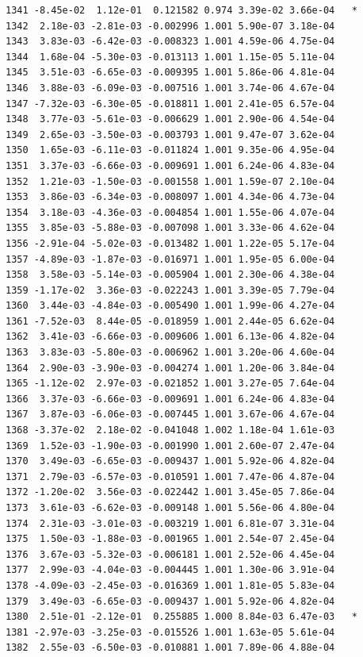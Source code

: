 \documentclass[
  letterpaper,
  DIV=11,
  numbers=noendperiod]{scrartcl}
\begin{document}
\begin{verbatim}
1341 -8.45e-02  1.12e-01  0.121582 0.974 3.39e-02 3.66e-04   *
1342  2.18e-03 -2.81e-03 -0.002996 1.001 5.90e-07 3.18e-04    
1343  3.83e-03 -6.42e-03 -0.008323 1.001 4.59e-06 4.75e-04    
1344  1.68e-04 -5.30e-03 -0.013113 1.001 1.15e-05 5.11e-04    
1345  3.51e-03 -6.65e-03 -0.009395 1.001 5.86e-06 4.81e-04    
1346  3.88e-03 -6.09e-03 -0.007516 1.001 3.74e-06 4.67e-04    
1347 -7.32e-03 -6.30e-05 -0.018811 1.001 2.41e-05 6.57e-04    
1348  3.77e-03 -5.61e-03 -0.006629 1.001 2.90e-06 4.54e-04    
1349  2.65e-03 -3.50e-03 -0.003793 1.001 9.47e-07 3.62e-04    
1350  1.65e-03 -6.11e-03 -0.011824 1.001 9.35e-06 4.95e-04    
1351  3.37e-03 -6.66e-03 -0.009691 1.001 6.24e-06 4.83e-04    
1352  1.21e-03 -1.50e-03 -0.001558 1.001 1.59e-07 2.10e-04    
1353  3.86e-03 -6.34e-03 -0.008097 1.001 4.34e-06 4.73e-04    
1354  3.18e-03 -4.36e-03 -0.004854 1.001 1.55e-06 4.07e-04    
1355  3.85e-03 -5.88e-03 -0.007098 1.001 3.33e-06 4.62e-04    
1356 -2.91e-04 -5.02e-03 -0.013482 1.001 1.22e-05 5.17e-04    
1357 -4.89e-03 -1.87e-03 -0.016971 1.001 1.95e-05 6.00e-04    
1358  3.58e-03 -5.14e-03 -0.005904 1.001 2.30e-06 4.38e-04    
1359 -1.17e-02  3.36e-03 -0.022243 1.001 3.39e-05 7.79e-04    
1360  3.44e-03 -4.84e-03 -0.005490 1.001 1.99e-06 4.27e-04    
1361 -7.52e-03  8.44e-05 -0.018959 1.001 2.44e-05 6.62e-04    
1362  3.41e-03 -6.66e-03 -0.009606 1.001 6.13e-06 4.82e-04    
1363  3.83e-03 -5.80e-03 -0.006962 1.001 3.20e-06 4.60e-04    
1364  2.90e-03 -3.90e-03 -0.004274 1.001 1.20e-06 3.84e-04    
1365 -1.12e-02  2.97e-03 -0.021852 1.001 3.27e-05 7.64e-04    
1366  3.37e-03 -6.66e-03 -0.009691 1.001 6.24e-06 4.83e-04    
1367  3.87e-03 -6.06e-03 -0.007445 1.001 3.67e-06 4.67e-04    
1368 -3.37e-02  2.18e-02 -0.041048 1.002 1.18e-04 1.61e-03    
1369  1.52e-03 -1.90e-03 -0.001990 1.001 2.60e-07 2.47e-04    
1370  3.49e-03 -6.65e-03 -0.009437 1.001 5.92e-06 4.82e-04    
1371  2.79e-03 -6.57e-03 -0.010591 1.001 7.47e-06 4.87e-04    
1372 -1.20e-02  3.56e-03 -0.022442 1.001 3.45e-05 7.86e-04    
1373  3.61e-03 -6.62e-03 -0.009148 1.001 5.56e-06 4.80e-04    
1374  2.31e-03 -3.01e-03 -0.003219 1.001 6.81e-07 3.31e-04    
1375  1.50e-03 -1.88e-03 -0.001965 1.001 2.54e-07 2.45e-04    
1376  3.67e-03 -5.32e-03 -0.006181 1.001 2.52e-06 4.45e-04    
1377  2.99e-03 -4.04e-03 -0.004445 1.001 1.30e-06 3.91e-04    
1378 -4.09e-03 -2.45e-03 -0.016369 1.001 1.81e-05 5.83e-04    
1379  3.49e-03 -6.65e-03 -0.009437 1.001 5.92e-06 4.82e-04    
1380  2.51e-01 -2.12e-01  0.255885 1.000 8.84e-03 6.47e-03   *
1381 -2.97e-03 -3.25e-03 -0.015526 1.001 1.63e-05 5.61e-04    
1382  2.55e-03 -6.50e-03 -0.010881 1.001 7.89e-06 4.88e-04    

\end{verbatim}
\end{document}
